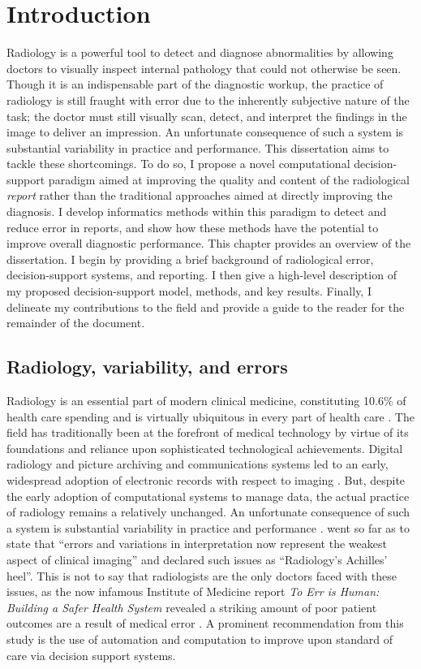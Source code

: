 \chapter{Introduction}
Radiology is a powerful tool to detect and diagnose abnormalities by allowing doctors to visually inspect internal pathology that could not otherwise be seen. Though it is an indispensable part of the diagnostic workup, the practice of radiology is still fraught with error due to the inherently subjective nature of the task; the doctor must still visually scan, detect, and interpret the findings in the image to deliver an impression. An unfortunate consequence of such a system is substantial variability in practice and performance. This dissertation aims to tackle these shortcomings. To do so, I propose a novel computational decision-support paradigm aimed at improving the quality and content of the radiological \emph{report} rather than the traditional approaches aimed at directly improving the diagnosis. I develop informatics methods within this paradigm to detect and reduce error in reports, and show how these methods have the potential to improve overall diagnostic performance. This chapter provides an overview of the dissertation. I begin by providing a brief background of radiological error, decision-support systems, and reporting. I then give a high-level description of my proposed decision-support model, methods, and key results. Finally, I delineate my contributions to the field and provide a guide to the reader for the remainder of the document.

\section{Radiology, variability, and errors}
Radiology is an essential part of modern clinical medicine, constituting 10.6\% of health care spending and is virtually ubiquitous in every part of health care \cite{Dodoo:tg}. The field has traditionally been at the forefront of medical technology by virtue of its foundations and reliance upon sophisticated technological achievements. Digital radiology and picture archiving and communications systems led to an early, widespread adoption of electronic records with respect to imaging \cite{Strickland:2000cv,Bryan:1999kn}. But, despite the early adoption of computational systems to manage data, the actual practice of radiology remains a relatively unchanged. An unfortunate consequence of such a system is substantial variability in practice and performance \cite{Fitzgerald:2001hn}.  went so far as to state that ``errors and variations in interpretation now represent the weakest aspect of clinical imaging'' and declared such issues as ``Radiology's Achilles' heel''. This is not to say that radiologists are the only doctors faced with these issues, as the now infamous Institute of Medicine report \emph{To Err is Human: Building a Safer Health System} revealed a striking amount of poor patient outcomes are a result of medical error \cite{Anonymous:2000va}. A prominent recommendation from this study is the use of automation and computation to improve upon standard of care via decision support systems.

